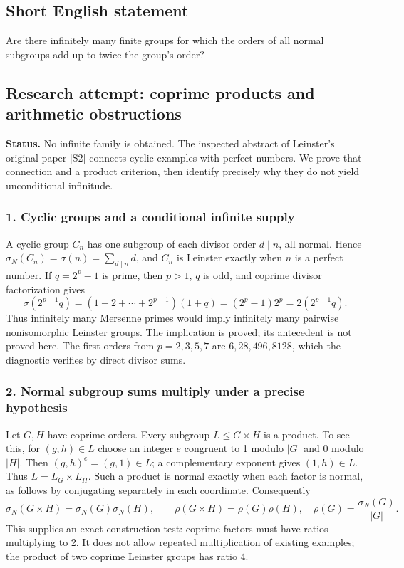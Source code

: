 \documentclass[11pt,a4paper]{article}
\begin{document}
\subsection{Short English statement}

Are there infinitely many finite groups for which the orders of all normal subgroups add up to twice the group’s order?

\subsection{Research attempt: coprime products and arithmetic obstructions}
\textbf{Status.} No infinite family is obtained. The inspected abstract of Leinster's original paper [S2] connects cyclic examples with perfect numbers. We prove that connection and a product criterion, then identify precisely why they do not yield unconditional infinitude.

\subsubsection{1. Cyclic groups and a conditional infinite supply}
A cyclic group $C_n$ has one subgroup of each divisor order $d\mid n$, all normal. Hence $\sigma_N(C_n)=\sigma(n)=\sum_{d\mid n}d$, and $C_n$ is Leinster exactly when $n$ is a perfect number. If $q=2^p-1$ is prime, then $p>1$, $q$ is odd, and coprime divisor factorization gives
\[\sigma(2^{p-1}q)=(1+2+\cdots+2^{p-1})(1+q)
 =(2^p-1)2^p=2(2^{p-1}q).\]
Thus infinitely many Mersenne primes would imply infinitely many pairwise nonisomorphic Leinster groups. The implication is proved; its antecedent is not proved here. The first orders from $p=2,3,5,7$ are $6,28,496,8128$, which the diagnostic verifies by direct divisor sums.

\subsubsection{2. Normal subgroup sums multiply under a precise hypothesis}
Let $G,H$ have coprime orders. Every subgroup $L\leq G\times H$ is a product. To see this, for $(g,h)\in L$ choose an integer $e$ congruent to 1 modulo $|G|$ and 0 modulo $|H|$. Then $(g,h)^e=(g,1)\in L$; a complementary exponent gives $(1,h)\in L$. Thus $L=L_G\times L_H$. Such a product is normal exactly when each factor is normal, as follows by conjugating separately in each coordinate. Consequently
\[\sigma_N(G\times H)=\sigma_N(G)\sigma_N(H),\qquad
\rho(G\times H)=\rho(G)\rho(H),\quad
\rho(G)=\frac{\sigma_N(G)}{|G|}.\tag{1}\]
This supplies an exact construction test: coprime factors must have ratios multiplying to 2. It does not allow repeated multiplication of existing examples; the product of two coprime Leinster groups has ratio 4.
\end{document}
